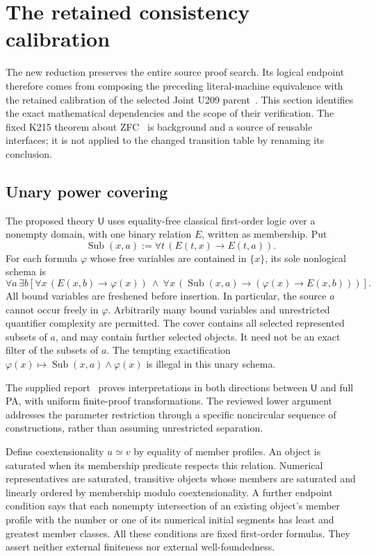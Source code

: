 \section{The retained consistency calibration}
\label{sec:calibration}

The new reduction preserves the entire source proof search. Its logical
endpoint therefore comes from composing the preceding literal-machine
equivalence with the retained calibration of the selected Joint U209
parent~\cite{joint}. This section identifies the exact mathematical
dependencies and the scope of their verification. The fixed K215 theorem
about ZFC~\cite{k215pa} is background and a source of reusable interfaces;
it is not applied to the changed transition table by renaming its conclusion.

\subsection{Unary power covering}

The proposed theory $\mathsf U$ uses equality-free classical first-order
logic over a nonempty domain, with one binary relation $E$, written as
membership. Put
\[
 \operatorname{Sub}(x,a):=\forall t\,(E(t,x)\to E(t,a)).
\]
For each formula $\varphi$ whose free variables are contained in
$\{x\}$, its sole nonlogical schema is
\begin{equation}
\label{eq:unary-calibration}
\forall a\,\exists b\left[
 \forall x\,(E(x,b)\to\varphi(x))\ \land\
 \forall x\,(\operatorname{Sub}(x,a)\to
                       (\varphi(x)\to E(x,b)))\right].
\end{equation}
All bound variables are freshened before insertion. In particular, the
source $a$ cannot occur freely in $\varphi$. Arbitrarily many bound
variables and unrestricted quantifier complexity are permitted. The cover
contains all selected represented subsets of $a$, and may contain further
selected objects. It need not be an exact filter of the subsets of $a$.
The tempting exactification $\varphi(x)\mapsto
\operatorname{Sub}(x,a)\land\varphi(x)$ is illegal in this unary schema.

The supplied report~\cite{unary} proves interpretations in both directions
between $\mathsf U$ and full PA, with uniform finite-proof transformations.
The reviewed lower argument addresses the parameter restriction through a
specific noncircular sequence of constructions, rather than assuming
unrestricted separation.

Define coextensionality $u\simeq v$ by equality of member profiles. An
object is saturated when its membership predicate respects this relation.
Numerical representatives are saturated, transitive objects whose members
are saturated and linearly ordered by membership modulo coextensionality.
A further endpoint condition says that each nonempty intersection of an
existing object's member profile with the number or one of its numerical
initial segments has least and greatest member classes. All these
conditions are fixed first-order formulas. They assert neither external
finiteness nor external well-foundedness.

